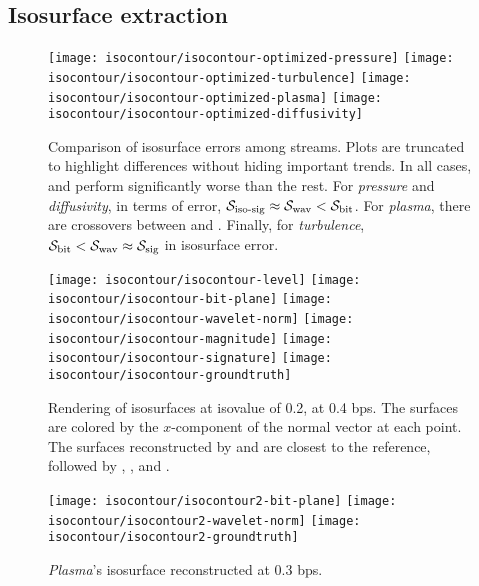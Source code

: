 \subsection{Isosurface extraction}\label{sec:isocontour}

\begin{figure*}[h]
\centering
{}
{\texttt{[image: isocontour/isocontour-optimized-pressure]}}
{\texttt{[image: isocontour/isocontour-optimized-turbulence]}}
{\texttt{[image: isocontour/isocontour-optimized-plasma]}}
{\texttt{[image: isocontour/isocontour-optimized-diffusivity]}}
\caption{Comparison of isosurface errors among streams. Plots are truncated to highlight differences
without hiding important trends. In all cases, \slvl and \smag perform significantly worse than the
rest. For \emph{pressure} and \emph{diffusivity}, in terms of error, $\sisg \approx \swav < \sbit$.
For \emph{plasma}, there are crossovers between \sbit and \swav. Finally, for \emph{turbulence},
$\sbit < \swav \approx \ssig$ in isosurface error.} \label{fig:isocontour-plots}
\vspace{1em}

\centering
{}
{\texttt{[image: isocontour/isocontour-level]}}
{\texttt{[image: isocontour/isocontour-bit-plane]}}
{\texttt{[image: isocontour/isocontour-wavelet-norm]}}
{\texttt{[image: isocontour/isocontour-magnitude]}}
{\texttt{[image: isocontour/isocontour-signature]}}
{\texttt{[image: isocontour/isocontour-groundtruth]}} 
\caption{Rendering of isosurfaces at isovalue of 0.2, at 0.4 bps. The surfaces are colored by the
$x$-component of the normal vector at each point. The surfaces reconstructed by \swav and \sisg are
closest to the reference, followed by \sbit, \smag, and \slvl.}
\label{fig:isocontour-surfaces-pressure}
\end{figure*}

\begin{figure}[h]
\centering
{}
{\texttt{[image: isocontour/isocontour2-bit-plane]}}
{\texttt{[image: isocontour/isocontour2-wavelet-norm]}}
{\texttt{[image: isocontour/isocontour2-groundtruth]}}
\caption{\emph{Plasma}'s isosurface reconstructed at 0.3 bps.}
\label{fig:isocontour-surfaces-plasma}
\end{figure}


